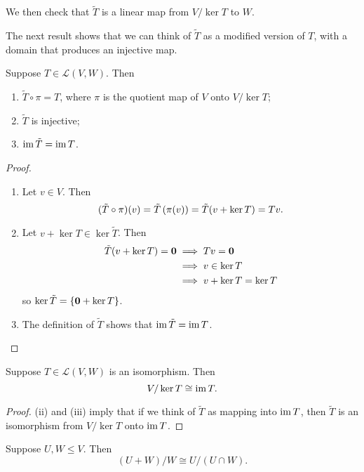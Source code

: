 We then check that $\tilde{T}$ is a linear map from $V/\ker T$ to $W$.

The next result shows that we can think of $\tilde{T}$ as a modified version of $T$, with a domain that produces an injective map.

\begin{lemma}
Suppose $T\in\mathcal{L}(V,W)$. Then
\begin{enumerate}[label=(\roman*)]
\item $\tilde{T}\circ\pi=T$, where $\pi$ is the quotient map of $V$ onto $V/\ker T$;
\item $\tilde{T}$ is injective;
\item $\operatorname{im}\tilde{T}=\operatorname{im} T$.
\end{enumerate}
\end{lemma}

\begin{proof} \
\begin{enumerate}[label=(\roman*)]
\item Let $v\in V$. Then
\[(\tilde{T}\circ\pi)(v)=\tilde{T}\left(\pi(v)\right)=\tilde{T}(v+\ker T)=Tv.\]
\item Let $v+\ker T\in\ker\tilde{T}$. Then
\begin{align*}
\tilde{T}(v+\ker T)=\vb{0}
&\implies Tv=\vb{0}\\
&\implies v\in\ker T\\
&\implies v+\ker T=\ker T
\end{align*}
so $\ker\tilde{T}=\{\vb{0}+\ker T\}$.
\item The definition of $\tilde{T}$ shows that $\operatorname{im}\tilde{T}=\operatorname{im} T$.
\end{enumerate}
\end{proof}

\begin{theorem}
Suppose $T\in\mathcal{L}(V,W)$ is an isomorphism. Then
\begin{equation}
V/\ker T\cong\operatorname{im} T.
\end{equation}
\end{theorem}

\begin{proof}
(ii) and (iii) imply that if we think of $\tilde{T}$ as mapping into $\operatorname{im} T$, then $\tilde{T}$ is an isomorphism from $V/\ker T$ onto $\operatorname{im} T$.
\end{proof}

\begin{theorem}
Suppose $U,W\le V$. Then
\begin{equation}
(U+W)/W\cong U/(U\cap W).
\end{equation}
\end{theorem}

